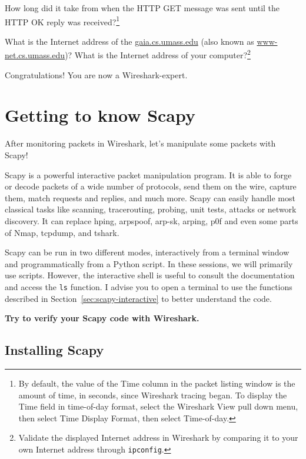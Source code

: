 \documentclass[11pt,a4paper]{article}
\begin{document}
\begin{question}
    How long did it take from when the HTTP GET message was sent until the HTTP
	OK reply was received?\footnote{By default, the value of the Time column in the packet listing
		window is the amount of time, in seconds, since Wireshark tracing began.
		To display the Time field in time-of-day format, select the Wireshark View pull
		down menu, then select Time Display Format, then select Time-of-day.}
\end{question}

\begin{question}
    What is the Internet address of the \url{gaia.cs.umass.edu} (also known as \url{www-net.cs.umass.edu})? What is the Internet address of your computer?\footnote{Validate the displayed Internet address in Wireshark by comparing it to your own Internet address through \texttt{ipconfig}.}
\end{question}

Congratulations! You are now a Wireshark-expert.

\FloatBarrier
\section{Getting to know Scapy}\label{sec:getting-to-know-scapy}
After monitoring packets in Wireshark, let's manipulate some packets with Scapy!

Scapy is a powerful interactive packet manipulation program. It is able to forge or decode packets of a wide number of protocols, send them on the wire, capture them, match requests and replies, and much more. Scapy can easily handle most classical tasks like scanning, tracerouting, probing, unit tests, attacks or network discovery. It can replace hping, arpspoof, arp-sk, arping, p0f and even some parts of Nmap, tcpdump, and tshark.

Scapy can be run in two different modes, interactively from a terminal window and programmatically from a Python script. 
In these sessions, we will primarily use scripts. However, the interactive shell is useful to consult the documentation and  access the \texttt{ls} function. I advise you to open a terminal to use the functions described in Section~\ref{sec:scapy-interactive} to better understand the code. 

\textbf{Try to verify your Scapy code with Wireshark.}


\subsection{Installing Scapy}
\end{document}
